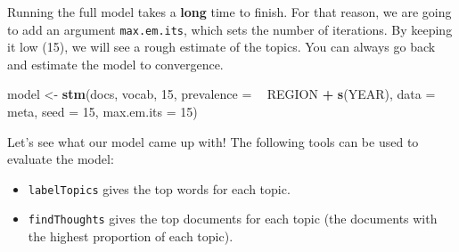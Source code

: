 \documentclass[]{book}
\newenvironment{Shaded}{\begin{snugshade}}{\end{snugshade}}
\newcommand{\KeywordTok}[1]{\textcolor[rgb]{0.13,0.29,0.53}{\textbf{#1}}}
\newcommand{\DataTypeTok}[1]{\textcolor[rgb]{0.13,0.29,0.53}{#1}}
\newcommand{\DecValTok}[1]{\textcolor[rgb]{0.00,0.00,0.81}{#1}}
\newcommand{\StringTok}[1]{\textcolor[rgb]{0.31,0.60,0.02}{#1}}
\newcommand{\OperatorTok}[1]{\textcolor[rgb]{0.81,0.36,0.00}{\textbf{#1}}}
\newcommand{\NormalTok}[1]{#1}
\providecommand{\tightlist}{%
  \setlength{\itemsep}{0pt}\setlength{\parskip}{0pt}}
\begin{document}
Running the full model takes a \textbf{long} time to finish. For that
reason, we are going to add an argument \texttt{max.em.its}, which sets
the number of iterations. By keeping it low (15), we will see a rough
estimate of the topics. You can always go back and estimate the model to
convergence.

\begin{Shaded}
\begin{Highlighting}[]
\NormalTok{model <-}\StringTok{ }\KeywordTok{stm}\NormalTok{(docs, vocab, }\DecValTok{15}\NormalTok{, }\DataTypeTok{prevalence =} \OperatorTok{~}\StringTok{ }\NormalTok{REGION }\OperatorTok{+}\StringTok{ }\KeywordTok{s}\NormalTok{(YEAR), }\DataTypeTok{data =}\NormalTok{ meta, }\DataTypeTok{seed =} \DecValTok{15}\NormalTok{, }\DataTypeTok{max.em.its =} \DecValTok{15}\NormalTok{)}
\end{Highlighting}
\end{Shaded}

Let's see what our model came up with! The following tools can be used
to evaluate the model:

\begin{itemize}
\tightlist
\item
  \texttt{labelTopics} gives the top words for each topic.
\item
  \texttt{findThoughts} gives the top documents for each topic (the
  documents with the highest proportion of each topic).
\end{itemize}
\end{document}
